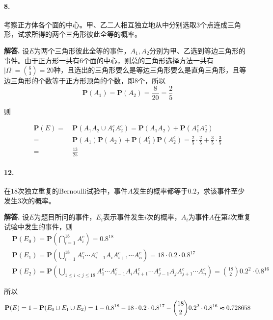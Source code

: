 \documentclass[12pt, a4paper, oneside]{ctexart}
\newenvironment{solution}{\par\noindent\textbf{解答. }}{\bigskip\par}
\begin{document}
\paragraph{8.}考察正方体各个面的中心。甲、乙二人相互独立地从中分别选取$3$个点连成三角形，试求所得的两个三角形彼此全等的概率。
\begin{solution}
    设$E$为两个三角形彼此全等的事件，$A_1,A_2$分别为甲、乙选到等边三角形的事件。由于正方形一共有$6$个面的中心，则总的三角形选择方法一共有$|\Omega| = \binom{6}{3} = 20$种，且选出的三角形要么是等边三角形要么是直角三角形，且等边三角形的个数等于正方形顶角的个数，即$8$个，所以
    \begin{equation*}
        \textbf{P}(A_1) = \textbf{P}(A_2) = \frac{8}{20} = \frac{2}{5}
    \end{equation*}

    则

    \begin{equation*}
        \begin{aligned}
            \textbf{P}(E) =&\ \textbf{P}(A_1A_2\cup A_1^cA_2^c) = \textbf{P}(A_1A_2)+\textbf{P}(A_1^cA_2^c)\\
            =&\ \textbf{P}(A_1)\textbf{P}(A_2) + \textbf{P}(A_1^c)\textbf{P}(A_2^c)=\frac{2}{5}\cdot \frac{2}{5} + \frac{3}{5} \cdot \frac{3}{5}\\
            =&\ \frac{13}{25}
        \end{aligned}
    \end{equation*}
\end{solution}
\paragraph{12.}在$18$次独立重复的$\text{Bernoulli}$试验中，事件$A$发生的概率都等于$0.2$，求该事件至少发生$3$次的概率。
\begin{solution}
    设$E$为题目所问的事件，$E_i$表示事件发生$i$次的概率，$A_i$为事件$A$在第$i$次重复试验中发生的事件，则
    \begin{equation*}
        \begin{aligned}
            &\textbf{P}(E_0) = \textbf{P}\left(\bigcap_{i=1}^{18}A_i^c\right) = 0.8^{18}\\
            &\textbf{P}(E_1) = \textbf{P}\left(\bigcup_{i=1}^{18}A_1^c\cdots A_{i-1}^cA_iA_{i+1}^c\cdots A_n^c\right) = 18\cdot 0.2\cdot 0.8^{17}\\
            &\textbf{P}(E_2) = \textbf{P}\left(\bigcup_{1\leqslant i < j\leqslant 18}A_1^c\cdots A_{i-1}^cA_iA_{i+1}^c\cdots A_{j-1}^cA_jA_{j+1}^c\cdots A_{n}^c\right) = \binom{18}{2}0.2^2\cdot 0.8^{16}
        \end{aligned}
    \end{equation*}

    所以
    \begin{equation*}
        \textbf{P}(E) = 1-\textbf{P}(E_0\cup E_1\cup E_2) = 1-0.8^{18}-18\cdot 0.2\cdot 0.8^{17}-\binom{18}{2} 0.2^2\cdot 0.8^{16} \thickapprox 0.728658
    \end{equation*}
\end{solution}
\end{document}
